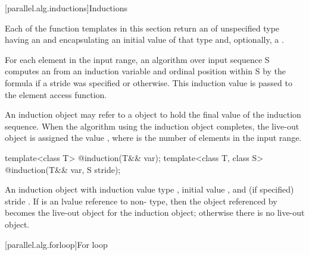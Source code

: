 [parallel.alg.inductions]{Inductions}

\pnum Each of the function templates in this section return an  of unspecified type having an  and encapsulating an initial value  of that type and, optionally, a .

\pnum For each element in the input range, an algorithm over input sequence S computes an  from an induction variable and ordinal position  within S by the formula  if a stride was specified or  otherwise. This induction value is passed to the element access function.

\pnum An induction object may refer to a  object to hold the final value of the induction sequence. When the algorithm using the induction object completes, the live-out object is assigned the value , where  is the number of elements in the input range.

\begin{itemdecl}
template<class T>
  @\unspec@ induction(T&& var);
template<class T, class S>
  @\unspec@ induction(T&& var, S stride);
\end{itemdecl}

\begin{itemdescr}
\pnum \returns An induction object with induction value type , initial value , and (if specified) stride . If  is an lvalue reference to non- type, then the object referenced by  becomes the live-out object for the induction object; otherwise there is no live-out object.
\end{itemdescr}

[parallel.alg.forloop]{For loop}

